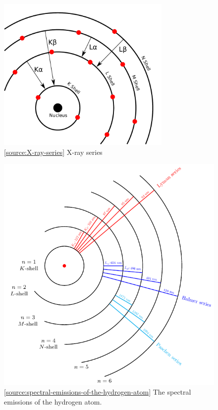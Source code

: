 \documentclass[oneside]{book}
\begin{document}
\begin{figure}[H]
    \centering
    \includegraphics[width=0.75\textwidth]{../images/CharacteristicRadiation.pdf}
        \caption{\ref{source:X-ray-series} X-ray series}
        \label{fig:X-ray-series}
\end{figure}
\begin{figure}[H]
    \centering
    \includegraphics[width=\textwidth]{../images/x-ray-peak-transitions/x-ray-transitions.pdf}
    \caption{\ref{source:spectral-emissions-of-the-hydrogen-atom} The spectral emissions of the hydrogen atom.}
    \label{fig:spectral-emissions-of-the-hydrogen-atom}
\end{figure}
\end{document}

